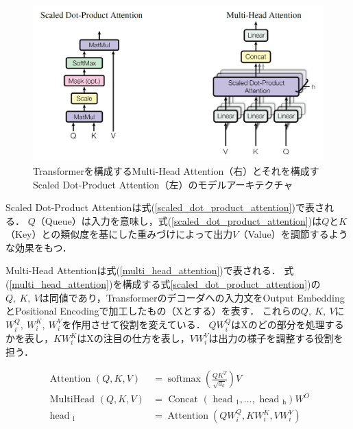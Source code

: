 \documentclass[12pt,a4j,dvipdfmx]{jreport}
\begin{document}
\begin{figure}[H]
	\centering
	\includegraphics[keepaspectratio, width=120mm]{img/attentions-of-transformer.png}
	\caption{Transformerを構成するMulti-Head Attention（右）とそれを構成すScaled Dot-Product Attention（左）のモデルアーキテクチャ\protect\footnotemark[3]}
	\label{fig_attentions-of-transformer}
\end{figure}

Scaled Dot-Product Attentionは式(\ref{scaled_dot_product_attention})で表される．
$Q$（Queue）は入力を意味し，式(\ref{scaled_dot_product_attention})は$Q$と$K$（Key）との類似度を基にした重みづけによって出力$V$（Value）を調節するような効果をもつ．

Multi-Head Attentionは式(\ref{multi_head_attention})で表される．
式(\ref{multi_head_attention})を構成する式\ref{scaled_dot_product_attention})の$Q,~ K,~ V$は同値であり，Transformerのデコーダへの入力文をOutput EmbeddingとPositional Encodingで加工したもの（Xとする）を表す．
これらの$Q,~ K,~ V$に$W_i^Q,~ W_i^K,~ W_i^V$を作用させて役割を変えている．
$QW_i^Q$はXのどの部分を処理するかを表し，$KW_i^K$はXの注目の仕方を表し，$VW_i^V$は出力の様子を調整する役割を担う．

\begin{align}
  \text { Attention }(Q, K, V) &= \operatorname{softmax}\left(\frac{Q K^{T}}{\sqrt{d_{k}}}\right) V
  \label{scaled_dot_product_attention}
  \\
  \text { MultiHead }(Q, K, V) &=\text { Concat }\left(\text { head }_{1}, \ldots, \text { head }_{\mathrm{h}}\right) W^{O}
  \label{multi_head_attention}
  \\
  \text { head }_{\mathrm{i}} &=\operatorname{Attention}\left(Q W_{i}^{Q}, K W_{i}^{K}, V W_{i}^{V}\right)
  \label{substituted_scaled_dot_product_attention}
\end{align}
\end{document}
